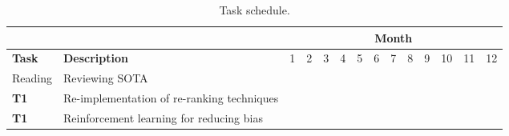 %
\begin{table}[t!]
	\centering
	\scriptsize	
	\caption{Task schedule.}
	\begin{tabular}{|p{0.80cm}|p{5.00cm}|p{0.40cm}|p{0.40cm}|p{0.40cm}|p{0.40cm}|p{0.40cm}|p{0.40cm}|p{0.40cm}|p{0.40cm}|p{0.40cm}|p{0.40cm}|p{0.40cm}|p{0.40cm}|}  \hline
		& & \multicolumn{12}{c|}{\textbf{Month}} \\ \hline
		\textbf{Task} & \textbf{Description} & 1 & 2 & 3 & 4 & 5 & 6  & 7 & 8 & 9 &  10 & 11 & 12 \\ \hline
		Reading & Reviewing SOTA & \cellcolor{lightgray} & \cellcolor{lightgray} &  &  &  &   &  &  &  &   & \cellcolor{lightgray} &  \\ \hline
		\textbf{T1} & Re-implementation of re-ranking techniques &  & \cellcolor{lightgray} & \cellcolor{lightgray} &   &   &   &  &  &  &   &  &  \\ \hline
		\textbf{T1} & Reinforcement learning for reducing bias &  &  & \cellcolor{lightgray} & \cellcolor{lightgray} &  \cellcolor{lightgray} &  \cellcolor{lightgray}  &  &  &  &   &  &  \\ \hline

\end{tabular}
\end{table}

